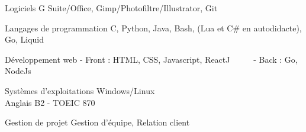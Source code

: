 
\begin{cvskills}

  \cvskill
    {Logiciels} %
    {G Suite/Office, Gimp/Photofiltre/Illustrator, Git} %
    
  \cvskill
    {Langages de programmation} %
    {C, Python, Java, Bash, (Lua et C\# en autodidacte), Go, Liquid} %
    
  \cvskill
    {Développement web} %
    {- Front : HTML, CSS, Javascript, ReactJ ~~~~~- Back : Go, NodeJs} %

  \cvskill
    {Systèmes d’exploitations} %
    {Windows/Linux}\\ %
    
  \cvskill
    {Anglais} %
    {B2 - TOEIC 870} %
    
  \cvskill
    {Gestion de projet} %
    {Gestion d'équipe, Relation client} %
    
\end{cvskills}


